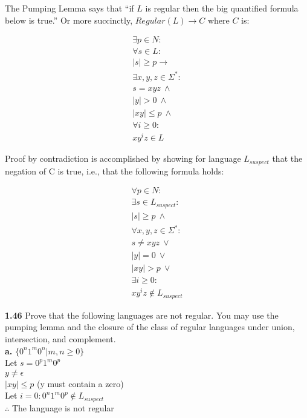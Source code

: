 \documentclass{article}
\begin{document}

The Pumping Lemma says that ``if $L$ is regular then the big quantified formula below is true.''  Or more succinctly, $Regular(L) \rightarrow C$ where $C$ is:

\begin{center}\[
\begin{array}{r}
\exists p \in N :\\
\forall s \in L : \\
|s| \geq p \rightarrow \\
\exists x, y, z \in \Sigma^* : \\
s = xyz\ \land \\
|y| > 0\ \land \\
|xy| \leq p\ \land \\
\forall i \geq 0 : \\
xy^iz \in L
\end{array}\]
\end{center}

Proof by contradiction is accomplished by showing for language $L_{suspect}$ that the negation of C is true, i.e., that the following formula holds:

\begin{center}\[
\begin{array}{r}
\forall p \in N :\\
\exists s \in L_{suspect} : \\
|s| \geq p\ \land \\
\forall x, y, z \in \Sigma^* : \\
s \neq xyz\ \lor \\
|y| = 0\ \lor \\
|xy| > p\ \lor \\
\exists i \geq 0 : \\
xy^iz \notin L_{suspect}
\end{array}\]
\end{center}


{\bf1.46} Prove that the following languages are not regular. You may use the pumping lemma and the closure of the class of regular languages under union, intersection, and complement.\\

{\bf a.} $\{0^{n}1^{m}0^{n} | m,n \geq 0\}$\\
\subitem Let $s = 0^{p}1^{m}0^{p}$\\
$y \neq \epsilon$\\
$|xy| \leq p$ (y must contain a zero)\\
Let $i = 0 : 0^{n}1^{m}0^{p} \notin L_{suspect}$\\
$\therefore$ The language is not regular\\
\end{document}
